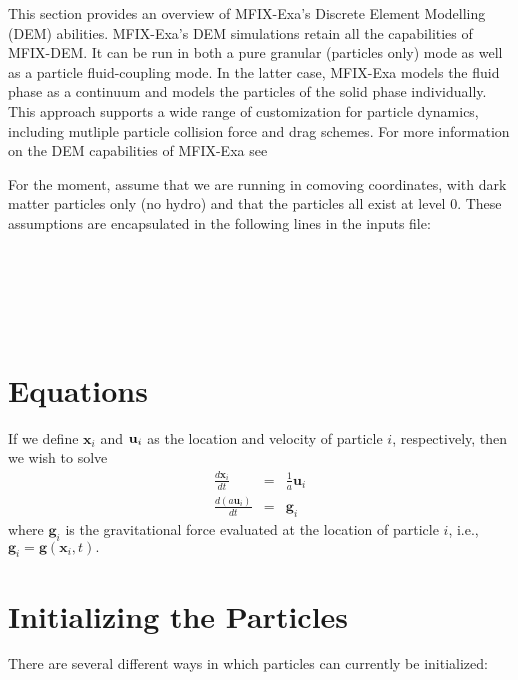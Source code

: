 This section provides an overview of MFIX-Exa's Discrete Element Modelling (DEM)
abilities. MFIX-Exa's DEM simulations retain all the capabilities of MFIX-DEM. 
It can be run in both a pure granular (particles only) mode  
as well as a particle fluid-coupling mode. In the latter case, MFIX-Exa models 
the fluid phase as a continuum and models the
particles of the solid phase individually. This approach supports a wide range 
of customization for particle dynamics, including mutliple particle collision 
force and drag schemes. For more information on the DEM capabilities of MFIX-Exa
see   


For the moment, assume that we are running in comoving coordinates, 
with dark matter particles only (no hydro) and that the particles all exist at level 0.   These assumptions are
encapsulated in the following lines in the inputs file: \\

 \\
 \\
 \\
 \\
 \\

\section{Equations}

If we define ${\mathbf x}_i$ and ${\bf u}_i$ as the location and velocity of particle $i$, respectively, then we wish
to solve
\begin{eqnarray}
\frac{d {\mathbf x}_i}{d t} &=& \frac{1}{a} {\mathbf u}_i \\
\frac{d (a {\mathbf u}_i) }{d t} &=& {\mathbf g}_i
\end{eqnarray}
where ${\mathbf g}_i$ is the gravitational force evaluated at the location of particle $i$, i.e., 
${\mathbf g}_i = {\mathbf g}({\mathbf x}_i,t).$

\section{Initializing the Particles}

\noindent There are several different ways in which particles can currently be initialized:

